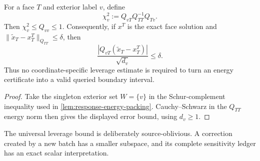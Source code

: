 \begin{corollary}
\label{cor:uniform-response-leverage}
For a face $T$ and exterior label $v$, define
\begin{equation*}
 \chi_v^2:=Q_{vT}Q_{TT}^{-1}Q_{Tv}.
\end{equation*}
Then $\chi_v^2\leq Q_{vv}\leq1$.  Consequently, if $x^T$ is the exact face
solution and
$\|\widetilde x_T-x^T_T\|_{Q_{TT}}\leq\delta$, then
\begin{equation}
 \frac{\left|Q_{vT}(\widetilde x_T-x^T_T)\right|}{\sqrt{d_v}}
 \leq\delta.
 \label{eq:uniform-response-leverage-error}
\end{equation}
Thus no coordinate-specific leverage estimate is required to turn an energy
certificate into a valid queried boundary interval.
\end{corollary}

\begin{proof}
Take the singleton exterior set $W=\{v\}$ in the Schur-complement inequality
used in \cref{lem:response-energy-packing}.  Cauchy--Schwarz in the
$Q_{TT}$ energy norm then gives the displayed error bound, using $d_v\geq1$.
\end{proof}

The universal leverage bound is deliberately source-oblivious.  A correction
created by a new batch has a smaller subspace, and its complete sensitivity
ledger has an exact scalar interpretation.

